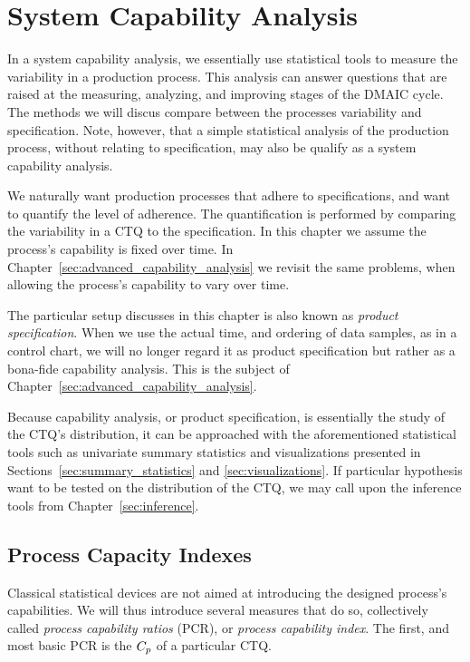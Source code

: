 
\chapter[Capability]{System Capability Analysis}
\label{sec:capability_analysis}



In a system capability analysis, we essentially use statistical tools to measure the variability in a production process.
This analysis can answer questions that are raised at the measuring, analyzing, and improving stages of the DMAIC cycle. 
The methods we will discus compare between the processes variability and specification. 
Note, however, that a simple statistical analysis of the production process, without relating to specification, may also be qualify as a system capability analysis.

We naturally want production processes that adhere to specifications, and want to quantify the level of adherence.
The quantification is performed by comparing the variability in a CTQ to the specification.
In this chapter we assume the process’s capability is fixed over time. 
In Chapter~\ref{sec:advanced_capability_analysis} we revisit the same problems, when allowing the process’s capability to vary over time. 

The particular setup discusses in this chapter is also known as \emph{product specification}.
When we use the actual time, and ordering of data samples, as in a control chart, we will no longer regard it as product specification but rather as a bona-fide capability analysis. This is the subject of Chapter~\ref{sec:advanced_capability_analysis}.



 
 
 
Because capability analysis, or product specification, is essentially the study of the CTQ's distribution, it can be approached with the aforementioned statistical tools such as univariate summary statistics and visualizations presented in Sections~\ref{sec:summary_statistics} and \ref{sec:visualizations}.
If particular hypothesis want to be tested on the distribution of the CTQ, we may call upon the inference tools from Chapter~\ref{sec:inference}.




\section[PCRs]{Process Capacity Indexes}
Classical statistical devices are not aimed at introducing the designed process's capabilities.
We will thus introduce several measures that do so, collectively called \emph{process capability ratios} (PCR), or \emph{process capability index}.
The first, and most basic PCR is the $C_p$ of a particular CTQ.

